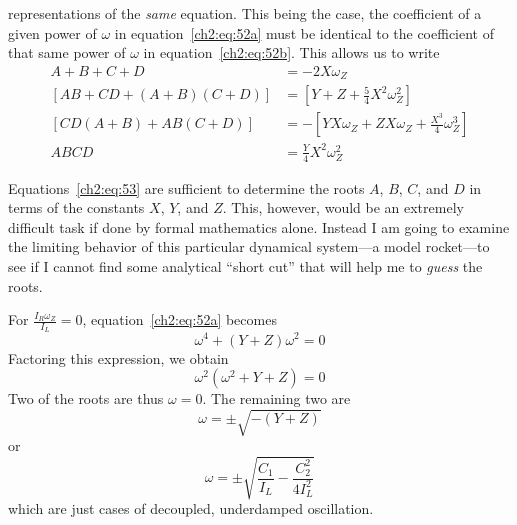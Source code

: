 representations of the \emph{same} equation. This being the case, the
coefficient of a given power of $\omega$ in equation~\eqref{ch2:eq:52a} must
be identical to the coefficient of that same power of $\omega$ in
equation~\eqref{ch2:eq:52b}. This allows us to write
\begin{subequations}\label{ch2:eq:53}
\begin{align}
A + B + C + D &= -2X\omega_Z \label{ch2:eq:53a}\\
\left[AB + CD + (A + B)(C + D)\right]
  &= \left[Y + Z + \tfrac{5}{4}X^2\omega_Z^2\right] \label{ch2:eq:53b}\\
\left[CD(A + B) + AB(C + D)\right]
  &= -\left[YX\omega_Z + ZX\omega_Z + \frac{X^3}{4}\omega_Z^3\right]
  \label{ch2:eq:53c}\\
ABCD &= \frac{Y}{4}X^2\omega_Z^2 \label{ch2:eq:53d}
\end{align}
\end{subequations}

Equations~\eqref{ch2:eq:53} are sufficient to determine the roots $A$, $B$,
$C$, and $D$ in terms of the constants $X$, $Y$, and $Z$. This, however, would
be an extremely difficult task if done by formal mathematics alone. Instead I
am going to examine the limiting behavior of this particular dynamical
system---a model rocket---to see if I cannot find some analytical ``short
cut'' that will help me to \emph{guess} the roots.

For $\frac{I_R\omega_Z}{I_L} = 0$, equation~\eqref{ch2:eq:52a} becomes
\begin{equation*}
\omega^4 + (Y + Z)\omega^2 = 0
\end{equation*}
Factoring this expression, we obtain
\begin{equation*}
\omega^2(\omega^2 + Y + Z) = 0
\end{equation*}
Two of the roots are thus $\omega = 0$. The remaining two are
\begin{equation*}
\omega = \pm\sqrt{-(Y + Z)}
\end{equation*}
or
\begin{equation*}
\omega = \pm\sqrt{\frac{C_1}{I_L} - \frac{C_2^2}{4I_L^2}}
\end{equation*}
which are just cases of decoupled, underdamped oscillation.

